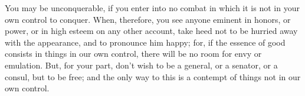You may be unconquerable, if you enter into no combat in which
it is not in your own control to conquer. When, therefore, you see
anyone eminent in honors, or power, or in high esteem on any other
account, take heed not to be hurried away with the appearance, and
to pronounce him happy; for, if the essence of good consists in things
in our own control, there will be no room for envy or emulation. But,
for your part, don't wish to be a general, or a senator, or a consul,
but to be free; and the only way to this is a contempt of things not
in our own control. 
